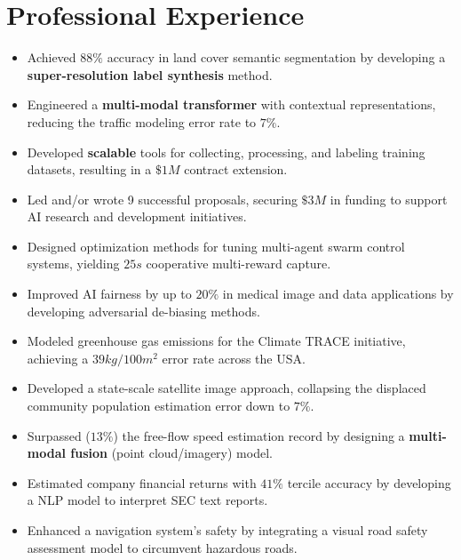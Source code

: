 \documentclass[11pt,a4paper,sans]{moderncv} %
\begin{document}
\section{Professional Experience}
{
\begin{itemize} 
	\item Achieved $88\%$ accuracy in land cover semantic segmentation by developing a \textbf{super-resolution label synthesis} method.
	\item Engineered a \textbf{multi-modal transformer} with contextual representations, reducing the traffic modeling error rate to $7\%$.
	\item Developed \textbf{scalable} tools for collecting, processing, and labeling training datasets, resulting in a $\$1M$ contract extension.
	\item Led and/or wrote 9 successful proposals, securing $\$3M$ in funding to support AI research and development initiatives.
\end{itemize}
}


{
\begin{itemize} 
	\item Designed optimization methods for tuning multi-agent swarm control systems, yielding $25s$ cooperative multi-reward capture.
	\item Improved AI fairness by up to $20\%$ in medical image and data applications by developing adversarial de-biasing methods.
	\item Modeled greenhouse gas emissions for the Climate TRACE initiative, achieving a $39kg/100m^2$ error rate across the USA.
	\item Developed a state-scale satellite image approach, collapsing the displaced community population estimation error down to $7\%$.
\end{itemize}
}


{
\begin{itemize}
	\item Surpassed ($13\%$) the free-flow speed estimation record by designing a \textbf{multi-modal fusion} (point cloud/imagery) model.
	\item Estimated company financial returns with $41\%$ tercile accuracy by developing a NLP model to interpret SEC text reports.
	\item Enhanced a navigation system's safety by integrating a visual road safety assessment model to circumvent hazardous roads.
\end{itemize}
}
\end{document}

